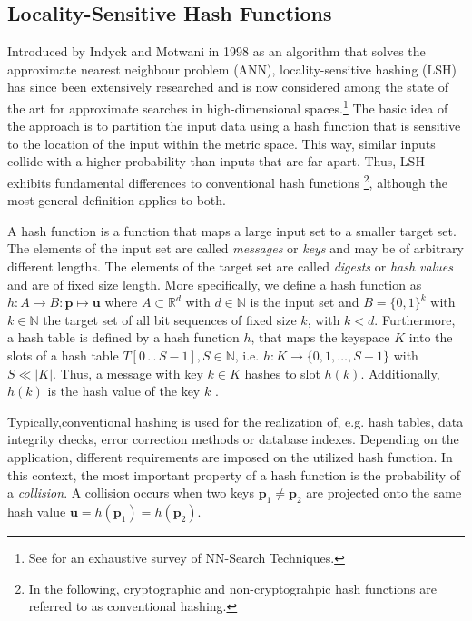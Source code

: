 \subsection{Locality-Sensitive Hash Functions} \label{subsec:locality-sensitive-hashes}

Introduced by Indyck and Motwani in 1998 \cite{indyk_approximate_1998} as an algorithm that solves the approximate nearest neighbour problem (ANN), locality-sensitive hashing (LSH) has since been extensively researched and is now considered among the state of the art for approximate searches in high-dimensional spaces.\footnote{See \cite{nagarkar2021exploring} for an exhaustive survey of NN-Search Techniques.} The basic idea of the approach is to partition the input data using a hash function that is sensitive to the location of the input within the metric space. This way, similar inputs collide with a higher probability than inputs that are far apart. Thus, LSH exhibits fundamental differences to conventional hash functions \footnote{In the following, cryptographic and non-cryptograhpic hash functions are referred to as conventional hashing.}, although the most general definition applies to both.

A hash function is a function that maps a large input set to a smaller target set. The elements of the input set are called \textit{messages} or \textit{keys} and may be of arbitrary different lengths. The elements of the target set are called \textit{digests} or \textit{hash values} and are of fixed size length. More specifically, we define a hash function as $h: A \rightarrow B : \bm{p} \mapsto \bm{u}$ where $A \subset \mathbb{R}^d$ with $d \in \mathbb{N}$ is the input set and $B=\{0, 1\}^k$ with $k \in \mathbb{N}$ the target set of all bit sequences of fixed size $k$, with $k < d$. Furthermore, a hash table is defined by a hash function $h$, that maps the keyspace $K$ into the slots of a hash table $T[0 \,.\,.\, S-1], S \in \mathbb{N}$, i.e. $h: K \rightarrow \{0, 1, \dots, S-1\}$ with $S \ll |K|$. Thus, a message with key $k \in K$ hashes to slot $h(k)$. Additionally, $h(k)$ is the hash value of the key $k$ \cite[256]{cormen2022introduction}.




Typically,conventional hashing is used for the realization of, e.g. hash tables, data integrity checks, error correction methods or database indexes. Depending on the application, different requirements are imposed on the utilized hash function. In this context, the most important property of a hash function is the probability of a \textit{collision}. A collision occurs when two keys $\bm{p}_1 \neq \bm{p}_2$ are projected onto the same hash value $\bm{u} = h(\bm{p}_1) = h(\bm{p}_2)$.

